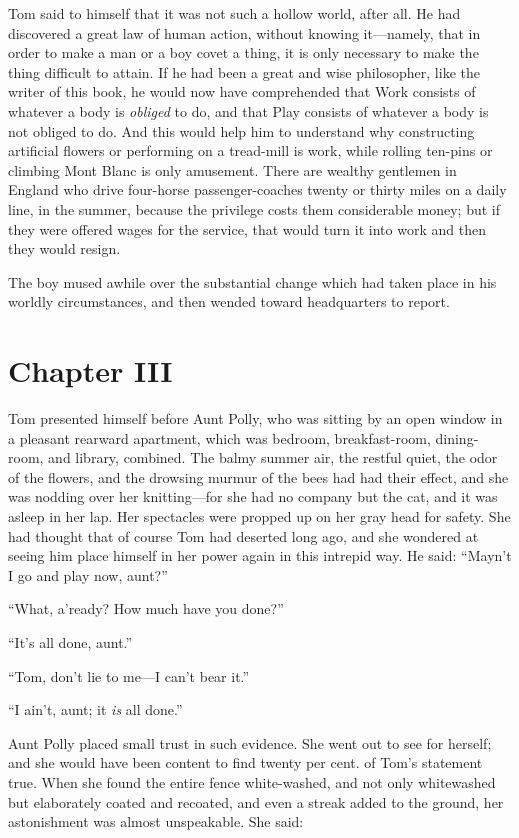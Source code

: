 \documentclass{book}
\begin{document}
Tom said to himself that it was not such a hollow world, after all. He had discovered a great law of human action, without knowing it—namely, that in order to make a man or a boy covet a thing, it is only necessary to make the thing difficult to attain. If he had been a great and wise philosopher, like the writer of this book, he would now have comprehended that Work consists of whatever a body is \emph{obliged} to do, and that Play consists of whatever a body is not obliged to do. And this would help him to understand why constructing artificial flowers or performing on a tread-mill is work, while rolling ten-pins or climbing Mont Blanc is only amusement. There are wealthy gentlemen in England who drive four-horse passenger-coaches twenty or thirty miles on a daily line, in the summer, because the privilege costs them considerable money; but if they were offered wages for the service, that would turn it into work and then they would resign.

The boy mused awhile over the substantial change which had taken place in his worldly circumstances, and then wended toward headquarters to report.

\chapter*{Chapter III}

Tom presented himself before Aunt Polly, who was sitting by an open window in a pleasant rearward apartment, which was bedroom, breakfast-room, dining-room, and library, combined. The balmy summer air, the restful quiet, the odor of the flowers, and the drowsing murmur of the bees had had their effect, and she was nodding over her knitting—for she had no company but the cat, and it was asleep in her lap. Her spectacles were propped up on her gray head for safety. She had thought that of course Tom had deserted long ago, and she wondered at seeing him place himself in her power again in this intrepid way. He said: “Mayn’t I go and play now, aunt?”

“What, a’ready? How much have you done?”

“It’s all done, aunt.”

“Tom, don’t lie to me—I can’t bear it.”

“I ain’t, aunt; it \emph{is} all done.”

Aunt Polly placed small trust in such evidence. She went out to see for herself; and she would have been content to find twenty per cent. of Tom’s statement true. When she found the entire fence white-washed, and not only whitewashed but elaborately coated and recoated, and even a streak added to the ground, her astonishment was almost unspeakable. She said:
\end{document}
